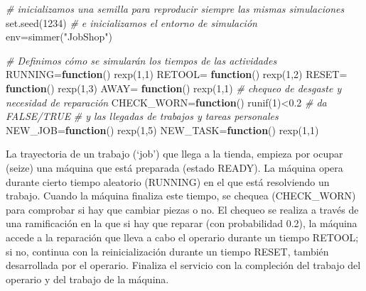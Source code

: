 \documentclass[
]{book}
\newenvironment{Shaded}{\begin{snugshade}}{\end{snugshade}}
\newcommand{\CommentTok}[1]{\textcolor[rgb]{0.56,0.35,0.01}{\textit{#1}}}
\newcommand{\ControlFlowTok}[1]{\textcolor[rgb]{0.13,0.29,0.53}{\textbf{#1}}}
\newcommand{\DecValTok}[1]{\textcolor[rgb]{0.00,0.00,0.81}{#1}}
\newcommand{\FloatTok}[1]{\textcolor[rgb]{0.00,0.00,0.81}{#1}}
\newcommand{\FunctionTok}[1]{\textcolor[rgb]{0.00,0.00,0.00}{#1}}
\newcommand{\NormalTok}[1]{#1}
\newcommand{\OtherTok}[1]{\textcolor[rgb]{0.56,0.35,0.01}{#1}}
\newcommand{\SpecialCharTok}[1]{\textcolor[rgb]{0.00,0.00,0.00}{#1}}
\newcommand{\StringTok}[1]{\textcolor[rgb]{0.31,0.60,0.02}{#1}}
\theoremstyle{definition}
\theoremstyle{definition}
\theoremstyle{definition}
\theoremstyle{definition}
\theoremstyle{remark}
\begin{document}
\begin{Shaded}
\begin{Highlighting}[]
\CommentTok{\# inicializamos una semilla para reproducir siempre las mismas simulaciones}
\FunctionTok{set.seed}\NormalTok{(}\DecValTok{1234}\NormalTok{)}
\CommentTok{\# e inicializamos el entorno de simulación}
\NormalTok{env}\OtherTok{=}\FunctionTok{simmer}\NormalTok{(}\StringTok{"JobShop"}\NormalTok{)}

\CommentTok{\# Definimos cómo se simularán los tiempos de las actividades}
\NormalTok{RUNNING}\OtherTok{=}\ControlFlowTok{function}\NormalTok{() }\FunctionTok{rexp}\NormalTok{(}\DecValTok{1}\NormalTok{,}\DecValTok{1}\NormalTok{)}
\NormalTok{RETOOL}\OtherTok{=} \ControlFlowTok{function}\NormalTok{() }\FunctionTok{rexp}\NormalTok{(}\DecValTok{1}\NormalTok{,}\DecValTok{2}\NormalTok{)}
\NormalTok{RESET}\OtherTok{=} \ControlFlowTok{function}\NormalTok{() }\FunctionTok{rexp}\NormalTok{(}\DecValTok{1}\NormalTok{,}\DecValTok{3}\NormalTok{)}
\NormalTok{AWAY}\OtherTok{=} \ControlFlowTok{function}\NormalTok{() }\FunctionTok{rexp}\NormalTok{(}\DecValTok{1}\NormalTok{,}\DecValTok{1}\NormalTok{)}
\CommentTok{\# chequeo de desgaste y necesidad de reparación}
\NormalTok{CHECK\_WORN}\OtherTok{=}\ControlFlowTok{function}\NormalTok{() }\FunctionTok{runif}\NormalTok{(}\DecValTok{1}\NormalTok{)}\SpecialCharTok{\textless{}}\FloatTok{0.2} \CommentTok{\# da FALSE/TRUE}
\CommentTok{\# y las llegadas de trabajos y tareas personales}
\NormalTok{NEW\_JOB}\OtherTok{=}\ControlFlowTok{function}\NormalTok{() }\FunctionTok{rexp}\NormalTok{(}\DecValTok{1}\NormalTok{,}\DecValTok{5}\NormalTok{)}
\NormalTok{NEW\_TASK}\OtherTok{=}\ControlFlowTok{function}\NormalTok{() }\FunctionTok{rexp}\NormalTok{(}\DecValTok{1}\NormalTok{,}\DecValTok{1}\NormalTok{)}
\end{Highlighting}
\end{Shaded}

La trayectoria de un trabajo (`job') que llega a la tienda, empieza por ocupar (seize) una máquina que está preparada (estado READY). La máquina opera durante cierto tiempo aleatorio (RUNNING) en el que está resolviendo un trabajo. Cuando la máquina finaliza este tiempo, se chequea (CHECK\_WORN) para comprobar si hay que cambiar piezas o no. El chequeo se realiza a través de una ramificación en la que si hay que reparar (con probabilidad 0.2), la máquina accede a la reparación que lleva a cabo el operario durante un tiempo RETOOL; si no, continua con la reinicialización durante un tiempo RESET, también desarrollada por el operario. Finaliza el servicio con la compleción del trabajo del operario y del trabajo de la máquina.
\end{document}
